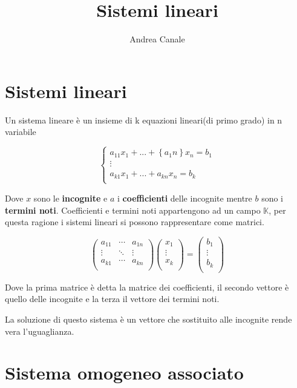 \documentclass[a4paper, 10pt]{article}
\title{Sistemi lineari}
\author{Andrea Canale}
\begin{document}
	
\maketitle
\tableofcontents
\section{Sistemi lineari}

Un sistema lineare è un insieme di k equazioni lineari(di primo grado) in n variabile

$$\left\{\begin{matrix}a_{11}x_1+...+\left\{a_1n\right\}x_n=b_1\\\vdots\\a_{k1}x_1+...+a_{kn}x_n=b_k\\\end{matrix}\right.$$

Dove $x$ sono le \textbf{incognite} e $a$ i \textbf{coefficienti} delle incognite mentre $b$ sono i \textbf{termini noti}. Coefficienti e termini noti appartengono ad un campo $\mathbb{K}$, per questa ragione i sistemi lineari si possono rappresentare come matrici.

$$\left(\begin{matrix}a_{11}&\cdots&a_{1n}\\\vdots&\ddots&\vdots\\a_{k1}&\cdots&a_{kn}\\\end{matrix}\right)\left(\begin{matrix}x_1\\\vdots\\x_k\\\end{matrix}\right)=\left(\begin{matrix}b_1\\\vdots\\b_k\\\end{matrix}\right)
$$

Dove la prima matrice è detta la matrice dei coefficienti, il secondo vettore è quello delle incognite e la terza il vettore dei termini noti.

La soluzione di questo sistema è un vettore che sostituito alle incognite rende vera l'uguaglianza.

\section{Sistema omogeneo associato}
\end{document}
